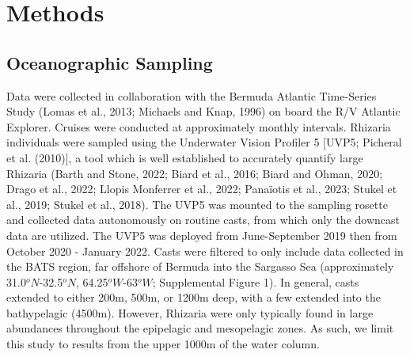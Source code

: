 \documentclass[
]{article}
\begin{document}
\hypertarget{methods}{%
\section{Methods}\label{methods}}

\hypertarget{oceanographic-sampling}{%
\subsection{Oceanographic Sampling}\label{oceanographic-sampling}}

Data were collected in collaboration with the Bermuda Atlantic
Time-Series Study (Lomas et al., 2013; Michaels and Knap, 1996) on board
the R/V Atlantic Explorer. Cruises were conducted at approximately
monthly intervals. Rhizaria individuals were sampled using the
Underwater Vision Profiler 5 {[}UVP5; Picheral et al. (2010){]}, a tool
which is well established to accurately quantify large Rhizaria (Barth
and Stone, 2022; Biard et al., 2016; Biard and Ohman, 2020; Drago et
al., 2022; Llopis Monferrer et al., 2022; Panaïotis et al., 2023; Stukel
et al., 2019; Stukel et al., 2018). The UVP5 was mounted to the sampling
rosette and collected data autonomously on routine casts, from which
only the downcast data are utilized. The UVP5 was deployed from
June-September 2019 then from October 2020 - January 2022. Casts were
filtered to only include data collected in the BATS region, far offshore
of Bermuda into the Sargasso Sea (approximately 31.0\(^oN\)-32.5\(^oN\),
64.25\(^oW\)-63\(^oW\); Supplemental Figure 1). In general, casts
extended to either 200m, 500m, or 1200m deep, with a few extended into
the bathypelagic (4500m). However, Rhizaria were only typically found in
large abundances throughout the epipelagic and mesopelagic zones. As
such, we limit this study to results from the upper 1000m of the water
column.
\end{document}

